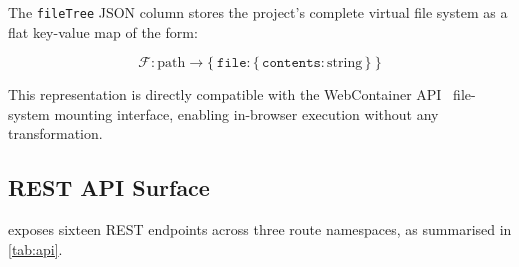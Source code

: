 The \texttt{fileTree} JSON column stores the project's complete virtual file
system as a flat key-value map of the form:

\begin{equation}
  \mathcal{F} : \text{path} \to \bigl\{\ \texttt{file}:
  \{\,\texttt{contents}: \text{string}\,\}\ \bigr\}
  \label{eq:filetree}
\end{equation}

This representation is directly compatible with the WebContainer
API~\cite{stackblitz2023wc} file-system mounting interface, enabling
in-browser execution without any transformation.

\subsection{REST API Surface}

\echoray{} exposes sixteen REST endpoints across three route namespaces,
as summarised in \cref{tab:api}.

